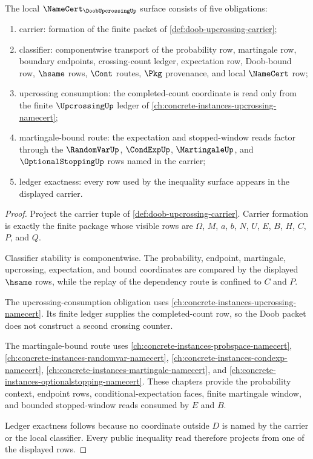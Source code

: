 \begin{theorem}
\label{thm:doob-upcrossing-namecert-obligations}
The local $\NameCert_{\DoobUpcrossingUp}$ surface consists of five obligations:
\begin{enumerate}
\item carrier: formation of the finite packet of \autoref{def:doob-upcrossing-carrier};
\item classifier: componentwise transport of the probability row, martingale row, boundary endpoints, crossing-count ledger, expectation row, Doob-bound row, $\hsame$ rows, $\Cont$ routes, $\Pkg$ provenance, and local $\NameCert$ row;
\item upcrossing consumption: the completed-count coordinate is read only from the finite $\UpcrossingUp$ ledger of \autoref{ch:concrete-instances-upcrossing-namecert};
\item martingale-bound route: the expectation and stopped-window reads factor through the $\RandomVarUp$, $\CondExpUp$, $\MartingaleUp$, and $\OptionalStoppingUp$ rows named in the carrier;
\item ledger exactness: every row used by the inequality surface appears in the displayed carrier.
\end{enumerate}
\end{theorem}
\begin{proof}
Project the carrier tuple of \autoref{def:doob-upcrossing-carrier}. Carrier formation is exactly the finite package whose visible rows are $\Omega$, $M$, $a$, $b$, $N$, $U$, $E$, $B$, $H$, $C$, $P$, and $Q$.

Classifier stability is componentwise. The probability, endpoint, martingale, upcrossing, expectation, and bound coordinates are compared by the displayed $\hsame$ rows, while the replay of the dependency route is confined to $C$ and $P$.

The upcrossing-consumption obligation uses \autoref{ch:concrete-instances-upcrossing-namecert}. Its finite ledger supplies the completed-count row, so the Doob packet does not construct a second crossing counter.

The martingale-bound route uses \autoref{ch:concrete-instances-probspace-namecert}, \autoref{ch:concrete-instances-randomvar-namecert}, \autoref{ch:concrete-instances-condexp-namecert}, \autoref{ch:concrete-instances-martingale-namecert}, and \autoref{ch:concrete-instances-optionalstopping-namecert}. These chapters provide the probability context, endpoint rows, conditional-expectation faces, finite martingale window, and bounded stopped-window reads consumed by $E$ and $B$.

Ledger exactness follows because no coordinate outside $D$ is named by the carrier or the local classifier. Every public inequality read therefore projects from one of the displayed rows.
\end{proof}
